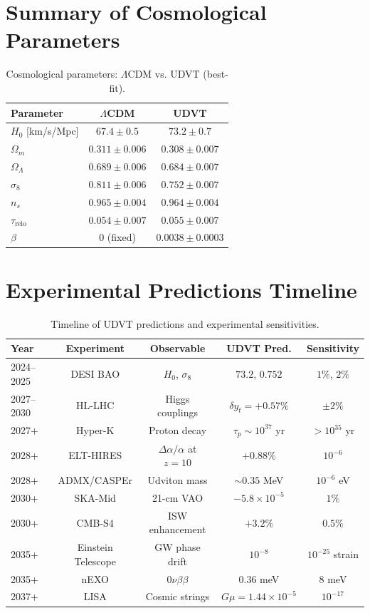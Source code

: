 \documentclass[12pt,a4paper]{book}
\theoremstyle{definition}
\theoremstyle{remark}
\begin{document}
\section{Summary of Cosmological Parameters}

\begin{table}[htbp]
\centering
\caption{Cosmological parameters: $\Lambda$CDM vs. UDVT (best-fit).}
\begin{tabular}{@{}lcc@{}}
\toprule
\textbf{Parameter} & \textbf{$\Lambda$CDM} & \textbf{UDVT} \\
\midrule
$H_0$ [km/s/Mpc] & $67.4 \pm 0.5$ & $73.2 \pm 0.7$ \\
$\Omega_m$ & $0.311 \pm 0.006$ & $0.308 \pm 0.007$ \\
$\Omega_\Lambda$ & $0.689 \pm 0.006$ & $0.684 \pm 0.007$ \\
$\sigma_8$ & $0.811 \pm 0.006$ & $0.752 \pm 0.007$ \\
$n_s$ & $0.965 \pm 0.004$ & $0.964 \pm 0.004$ \\
$\tau_{\mathrm{reio}}$ & $0.054 \pm 0.007$ & $0.055 \pm 0.007$ \\
$\beta$ & $0$ (fixed) & $0.0038 \pm 0.0003$ \\
\bottomrule
\end{tabular}
\end{table}

\section{Experimental Predictions Timeline}

\begin{table}[htbp]
\centering
\caption{Timeline of UDVT predictions and experimental sensitivities.}
\begin{tabular}{@{}lcccc@{}}
\toprule
\textbf{Year} & \textbf{Experiment} & \textbf{Observable} & \textbf{UDVT Pred.} & \textbf{Sensitivity} \\
\midrule
2024--2025 & DESI BAO & $H_0$, $\sigma_8$ & $73.2$, $0.752$ & $1\%$, $2\%$ \\
2027--2030 & HL-LHC & Higgs couplings & $\delta y_t = +0.57\%$ & $\pm 2\%$ \\
2027+ & Hyper-K & Proton decay & $\tau_p \sim 10^{37}$ yr & $> 10^{35}$ yr \\
2028+ & ELT-HIRES & $\Delta\alpha/\alpha$ at $z=10$ & $+0.88\%$ & $10^{-6}$ \\
2028+ & ADMX/CASPEr & Udviton mass & $\sim 0.35$ MeV & $10^{-6}$ eV \\
2030+ & SKA-Mid & 21-cm VAO & $-5.8 \times 10^{-5}$ & $1\%$ \\
2030+ & CMB-S4 & ISW enhancement & $+3.2\%$ & $0.5\%$ \\
2035+ & Einstein Telescope & GW phase drift & $10^{-8}$ & $10^{-25}$ strain \\
2035+ & nEXO & $0\nu\beta\beta$ & $0.36$ meV & $8$ meV \\
2037+ & LISA & Cosmic strings & $G\mu = 1.44 \times 10^{-5}$ & $10^{-17}$ \\
\bottomrule
\end{tabular}
\end{table}
\end{document}
